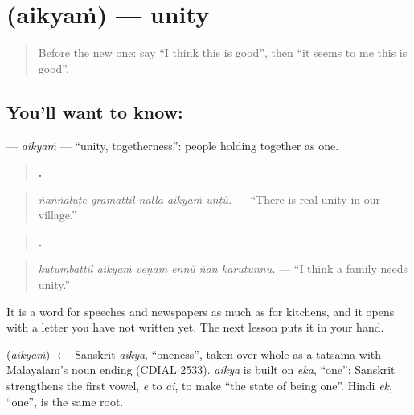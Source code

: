 \section[\texorpdfstring{\ml{ഐക്യം} (aikyaṁ)}{ഐക്യം (aikyaṁ)}]{ (aikyaṁ) — unity}

\label{lesson:ML-C341-aikyam}



\begin{quote}
Before the new one: say \textquotedblleft{}I think this is good\textquotedblright{}, then \textquotedblleft{}it seems to me this is good\textquotedblright{}.
\end{quote}

\subsection*{You'll want to know: }
\textbf{} — \emph{aikyaṁ} — \textquotedblleft{}unity, togetherness\textquotedblright{}: people holding together as one.

\begin{quote}
\textbf{    .}
\end{quote}

\begin{quote}
\emph{ñaṅṅaḷuṭe grāmattil nalla aikyaṁ uṇṭŭ.} — \textquotedblleft{}There is real unity in our village.\textquotedblright{}
\end{quote}

\begin{quote}
\textbf{     .}
\end{quote}

\begin{quote}
\emph{kuṭumbattil aikyaṁ vēṇaṁ ennŭ ñān karutunnu.} — \textquotedblleft{}I think a family needs unity.\textquotedblright{}
\end{quote}

It is a word for speeches and newspapers as much as for kitchens, and it opens with a letter you have not written yet. The next lesson puts it in your hand.

\begin{cousinweb}
\textbf{} (\emph{aikyaṁ}) $\leftarrow$ Sanskrit \emph{aikya}, \textquotedblleft{}oneness\textquotedblright{}, taken over whole as a tatsama with Malayalam's noun ending (CDIAL 2533). \emph{aikya} is built on \emph{eka}, \textquotedblleft{}one\textquotedblright{}: Sanskrit strengthens the first vowel, \emph{e} to \emph{ai}, to make \textquotedblleft{}the state of being one\textquotedblright{}. Hindi \emph{ek}, \textquotedblleft{}one\textquotedblright{}, is the same root.
\end{cousinweb}

